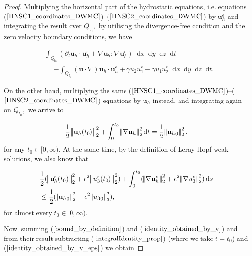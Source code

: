 \documentclass[12pt]{report}
\numberwithin{theorem}{chapter}
\numberwithin{corollary}{chapter}
\numberwithin{lemma}{chapter}
\numberwithin{remark}{chapter}
\numberwithin{definition}{chapter}
\numberwithin{prop}{chapter}
\newcommand*\diff{\mathop{}\!\mathrm{d}}
\begin{document}
\begin{proof}

  Multiplying the horizontal part of the hydrostatic equations, i.e. equations ($\ref{HNSC1_coordinates_DWMC}$)--($\ref{HNSC2_coordinates_DWMC}$) by $\mathbf{u}_h^\epsilon$ and integrating the result over $Q_{t_0},$ by utilising the divergence-free condition and the zero velocity boundary conditions, we have
  
  \begin{equation} \label{identity_obtained_by_v_eps}
    \begin{split}
      & \int_{Q_{t_0}} (\partial_t \mathbf{u}_h \cdot \mathbf{u}_h^\epsilon + \nabla \mathbf{u}_h : \nabla \mathbf{u}_h^\epsilon) \diff x \diff y \diff z \diff t \\
      & = - \int_{Q_{t_0}} (\mathbf{u} \cdot \nabla) \mathbf{u}_h \cdot \mathbf{u}_h^\epsilon + \gamma u_2 u_1^\epsilon - \gamma u_1 u_2^\epsilon \diff x \diff y \diff z \diff t.
    \end{split}
  \end{equation}
  
  On the other hand, multiplying the same ($\ref{HNSC1_coordinates_DWMC}$)--($\ref{HNSC2_coordinates_DWMC}$) equations by $\mathbf{u}_h$ instead, and integrating again on $Q_{t_0},$ we arrive to
  
  \begin{equation} \label{identity_obtained_by_v}
    \frac{1}{2} \norm{\mathbf{u}_h(t_0)}_2^2 + \int_0^{t_0} \norm{\nabla \mathbf{u}_h}_2^2 \diff t = \frac{1}{2} \norm{{\mathbf{u}_h}_0}_2^2,
  \end{equation}
%
for any $t_0 \in [0, \infty).$ At the same time, by the definition of Leray-Hopf weak solutions, we also know that

  \begin{equation} \label{bound_by_definition}
    \begin{split}
      & \frac{1}{2}( \norm{\mathbf{u}_h^\epsilon (t_0)}_2^2 + \epsilon^2 \norm{u_3^\epsilon(t_0)}_2^2)+ \int_0^{t_0} (\norm{\nabla \mathbf{u}_h^\epsilon}_2^2 + \epsilon^2 \norm{\nabla u_3^\epsilon}_2^2) \diff s \\
      & \leq \frac{1}{2} (\norm{{\mathbf{u}_h}_0}_2^2 + \epsilon^2 \norm{{u_3}_0}_2^2),
    \end{split}
  \end{equation}
%
for almost every $t_0 \in [0, \infty).$
  
Now, summing ($\ref{bound_by_definition}$) and ($\ref{identity_obtained_by_v}$) and from their result subtracting ($\ref{integralIdentity_prop}$) (where we take $t= t_0$) and ($\ref{identity_obtained_by_v_eps}$) we obtain
  

\end{proof}
\end{document}

